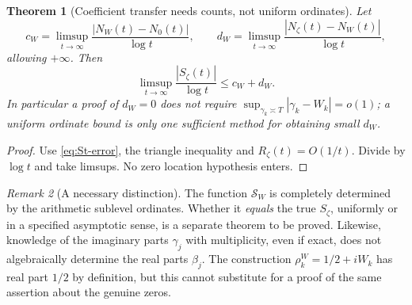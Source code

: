 \documentclass[11pt,leqno]{amsart}
\numberwithin{equation}{section}
\newtheorem{theorem}{Theorem}[section]
\theoremstyle{definition}
\theoremstyle{remark}
\newtheorem{remark}[theorem]{Remark}
\newcommand{\1}{\mathbf 1}
\newcommand{\Sc}{\mathscr S}
\begin{document}
\begin{theorem}[Coefficient transfer needs counts, not uniform ordinates]\label{thm:coef-transfer}
Let
\begin{equation}\label{eq:c-def}
 c_W=\limsup_{t\to\infty}\frac{|N_W(t)-N_0(t)|}{\log t},\qquad
 d_W=\limsup_{t\to\infty}\frac{|N_\zeta(t)-N_W(t)|}{\log t},
\end{equation}
allowing $+\infty$. Then
\begin{equation}\label{eq:coef-inequality}
 \boxed{\limsup_{t\to\infty}\frac{|S_\zeta(t)|}{\log t}\le c_W+d_W.}
\end{equation}
In particular a proof of $d_W=0$ does \emph{not} require $\sup_{\gamma_k\asymp T}|\gamma_k-W_k|=o(1)$; a uniform ordinate bound is only one sufficient method for obtaining small $d_W$.
\end{theorem}
\begin{proof}
Use \eqref{eq:St-error}, the triangle inequality and $R_\zeta(t)=O(1/t)$. Divide by $\log t$ and take limsups. No zero location hypothesis enters.
\end{proof}
\begin{remark}[A necessary distinction]\label{rem:determination}
The function $\Sc_W$ is completely determined by the arithmetic sublevel ordinates. Whether it \emph{equals} the true $S_\zeta$, uniformly or in a specified asymptotic sense, is a separate theorem to be proved. Likewise, knowledge of the imaginary parts $\gamma_j$ with multiplicity, even if exact, does not algebraically determine the real parts $\beta_j$. The construction $\rho^W_k=1/2+iW_k$ has real part $1/2$ by definition, but this cannot substitute for a proof of the same assertion about the genuine zeros.
\end{remark}
\end{document}
